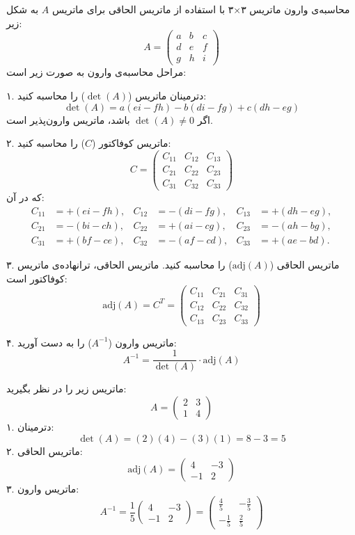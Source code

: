 \begin{nokteh}
	محاسبه‌ی وارون ماتریس ۳×۳ با استفاده از ماتریس الحاقی
	برای ماتریس \( A \) به شکل زیر:
	\[
	A = \begin{pmatrix}
		a & b & c \\
		d & e & f \\
		g & h & i
	\end{pmatrix}
	\]
	مراحل محاسبه‌ی وارون به صورت زیر است:
	
	۱. دترمینان ماتریس (\( \det(A) \)) را محاسبه کنید:
	\[
	\det(A) = a(ei - fh) - b(di - fg) + c(dh - eg)
	\]
	اگر \( \det(A) \neq 0 \) باشد، ماتریس وارون‌پذیر است.
	
	۲. ماتریس کوفاکتور (\( C \)) را محاسبه کنید:
	\[
	C = \begin{pmatrix}
		C_{11} & C_{12} & C_{13} \\
		C_{21} & C_{22} & C_{23} \\
		C_{31} & C_{32} & C_{33}
	\end{pmatrix}
	\]
	که در آن:
	\[
	\begin{aligned}
		C_{11} &= +(ei - fh), & C_{12} &= -(di - fg), & C_{13} &= +(dh - eg), \\
		C_{21} &= -(bi - ch), & C_{22} &= +(ai - cg), & C_{23} &= -(ah - bg), \\
		C_{31} &= +(bf - ce), & C_{32} &= -(af - cd), & C_{33} &= +(ae - bd).
	\end{aligned}
	\]
	
	۳. ماتریس الحاقی (\( \text{adj}(A) \)) را محاسبه کنید. ماتریس الحاقی، ترانهاده‌ی ماتریس کوفاکتور است:
	\[
	\text{adj}(A) = C^T = \begin{pmatrix}
		C_{11} & C_{21} & C_{31} \\
		C_{12} & C_{22} & C_{32} \\
		C_{13} & C_{23} & C_{33}
	\end{pmatrix}
	\]
	
	۴. ماتریس وارون (\( A^{-1} \)) را به دست آورید:
	\[
	A^{-1} = \frac{1}{\det(A)} \cdot \text{adj}(A)
	\]
\end{nokteh}
	

	
	\begin{example}
		
	ماتریس زیر را در نظر بگیرید:
	\[
	A = \begin{pmatrix}
		2 & 3 \\
		1 & 4
	\end{pmatrix}
	\]
	۱. دترمینان:
	\[
	\det(A) = (2)(4) - (3)(1) = 8 - 3 = 5
	\]
	۲. ماتریس الحاقی:
	\[
	\text{adj}(A) = \begin{pmatrix}
		4 & -3 \\
		-1 & 2
	\end{pmatrix}
	\]
	۳. ماتریس وارون:
	\[
	A^{-1} = \frac{1}{5} \begin{pmatrix}
		4 & -3 \\
		-1 & 2
	\end{pmatrix} = \begin{pmatrix}
		\frac{4}{5} & -\frac{3}{5} \\
		-\frac{1}{5} & \frac{2}{5}
	\end{pmatrix}
	\]
	\end{example}
	
